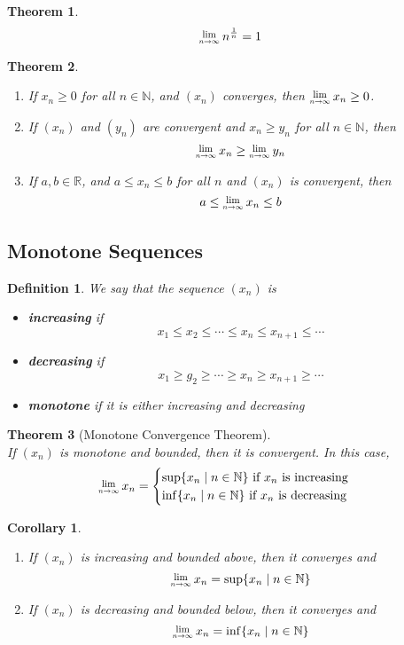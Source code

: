 \documentclass[8pt]{article}
\newcommand{\Lim}[1]{\raisebox{0.5ex}{\scalebox{0.8}{$\displaystyle \lim_{#1}\;$}}}
\newtheorem{definition}{Definition}[section]
\newtheorem{theorem}{Theorem}[section]
\newtheorem{corollary}{Corollary}[section]
\theoremstyle{definition}
\begin{document}
\begin{theorem}
\[
\Lim{n\to\infty}n^\frac{1}{n}=1
\]
\end{theorem}
\begin{theorem}
\normalfont
\begin{enumerate}
\item If $x_n\geq 0$ for all $n\in\mathbb{N}$, and $(x_n)$ converges, then $\Lim{n\to\infty}x_n\geq 0$.
\item If $(x_n)$ and $(y_n)$ are convergent and $x_n\geq y_n$ for all $n\in\mathbb{N}$, then
\[
\Lim{n\to\infty} x_n\geq \Lim{n\to\infty}y_n
\]
\item If $a,b\in\mathbb{R}$, and $a\leq x_n\leq b$ for all $n$ and $(x_n)$ is convergent, then
\[
a\leq \Lim{n\to\infty}x_n\leq b
\]
\end{enumerate}
\end{theorem}
\subsection{Monotone Sequences}
\begin{definition}\normalfont We say that the sequence $(x_n)$ is
\begin{itemize}
\item \textbf{increasing} if
\[
x_1\leq x_2\leq\cdots\leq x_n\leq x_{n+1}\leq \cdots
\]
\item \textbf{decreasing} if
\[
x_1\geq g_2\geq\cdots\geq x_n\geq x_{n+1}\geq \cdots
\]
\item \textbf{monotone} if it is either increasing and decreasing
\end{itemize}
\end{definition}
\begin{theorem}[Monotone Convergence Theorem]
\hfill\\\normalfont If $(x_n)$ is monotone and bounded, then it is convergent. In this case,
\[
\Lim{n\to\infty}x_n = 
\begin{cases}
\sup\{x_n\mid n\in\mathbb{N}\}\text{ if }x_n\text{ is increasing}\\
\inf\{x_n\mid n\in\mathbb{N}\}\text{ if }x_n\text{ is decreasing}
\end{cases}
\]
\end{theorem}
\begin{corollary}
\begin{enumerate}
\item If $(x_n)$ is increasing and bounded above, then it converges and 
\[
\Lim{n\to\infty}x_n = \sup\{x_n\mid n\in\mathbb{N}\}
\]
\item If $(x_n)$ is decreasing and bounded below, then it converges and 
\[
\Lim{n\to\infty}x_n = \inf\{x_n\mid n\in\mathbb{N}\}
\]
\end{enumerate}
\end{corollary}
\end{document}

